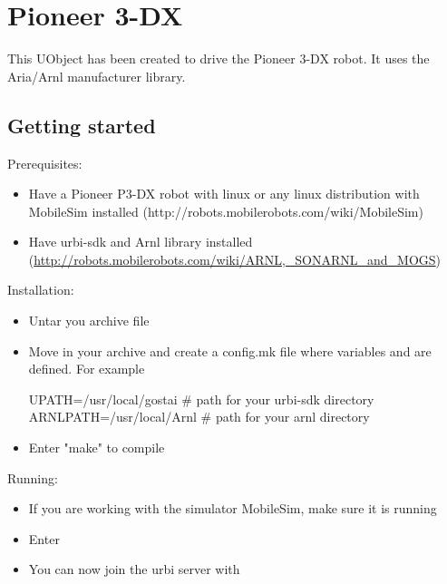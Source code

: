 
\chapter{Pioneer 3-DX}
\label{sec:p3dx}

This UObject has been created to drive the Pioneer 3-DX robot. It uses the
Aria/Arnl manufacturer library.

\section{Getting started}

Prerequisites:
\begin{itemize}
\item Have a Pioneer P3-DX robot with linux or any linux distribution with
  MobileSim installed (http://robots.mobilerobots.com/wiki/MobileSim)

\item Have urbi-sdk and Arnl library installed
  (\url{http://robots.mobilerobots.com/wiki/ARNL,_SONARNL_and_MOGS})
\end{itemize}

Installation:
\begin{itemize}
\item Untar you archive file
\item Move in your archive and create a config.mk file where variables
   and  are defined. For example
\begin{shell}
UPATH=/usr/local/gostai	 # path for your urbi-sdk directory
ARNLPATH=/usr/local/Arnl # path for your arnl directory
\end{shell}
\item Enter "make" to compile
\end{itemize}

Running:
\begin{itemize}
\item If you are working with the simulator MobileSim, make sure it is
  running
\item Enter 
\item You can now join the urbi server with 
\end{itemize}


